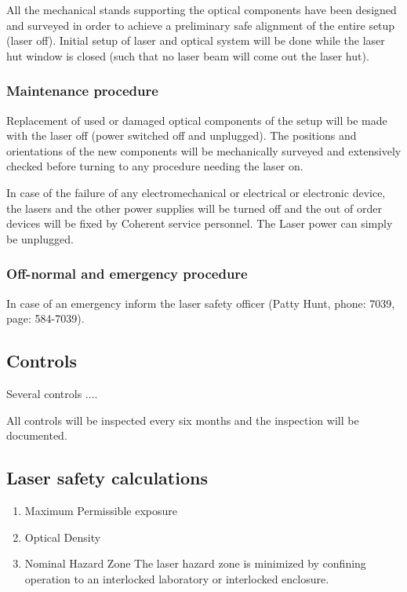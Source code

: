 All the mechanical stands supporting the optical components have been designed and
surveyed in order to achieve a preliminary safe alignment of the entire setup (laser
off).  Initial setup of laser and optical system will be done while the laser 
hut window is closed (such that no laser beam will come out the laser hut).

\subsubsection{Maintenance procedure}

Replacement of used or damaged optical components of the setup will be made with the
laser off (power switched off and unplugged).  The positions and orientations of the new components will be mechanically
surveyed and extensively checked before turning to any procedure needing the laser on.

In case of the failure of any electromechanical or electrical or electronic device,
the lasers and the other power supplies will be turned off and the out of order devices
will be fixed by Coherent service personnel. The Laser power
can simply be unplugged.


\subsubsection{Off-normal and emergency procedure}

In case of an emergency inform the laser safety officer (Patty Hunt, phone: 7039,
page: 584-7039). 


\subsection{Controls}

Several controls ....

All controls will be inspected every six months
and the inspection will be documented.

\subsection{Laser safety calculations}

\begin {enumerate}
\item {Maximum Permissible exposure}
\item {Optical Density}
\item {Nominal Hazard Zone}
The laser hazard zone is minimized by confining operation to an interlocked 
laboratory or interlocked enclosure.
\end{enumerate}



